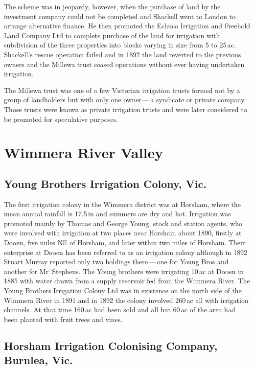 The scheme was in jeopardy, however, when the purchase of land by the
investment company could not be completed and Shackell went to London
to arrange alternative finance.  He then promoted the Echuca
Irrigation and Freehold Land Company Ltd to complete purchase of the
land for irrigation with subdivision of the three properties into
blocks varying in size from 5 to 25\,ac.  Shackell's rescue operation
failed and in 1892 the land reverted to the previous owners and the
Millewa trust ceased operations without ever having undertaken
irrigation.

The Millewa trust was one of a few Victorian irrigation trusts formed
not by a group of landholders but with only one owner\,---\,a syndicate
or private company.  Those trusts were known as private irrigation
trusts and were later considered to be promoted for speculative
purposes.

\section*{Wimmera River Valley}

\subsection*{Young Brothers Irrigation Colony, Vic.}

The first irrigation colony in the Wimmera district was at Horsham,
where the mean annual rainfall is 17.5\,in and summers are dry and
hot.  Irrigation was promoted mainly by Thomas and George Young, stock
and station agents, who were involved with irrigation at two places
near Horsham about 1890, firstly at Dooen, five miles NE of Horsham,
and later within two miles of Horsham.  Their enterprise at Dooen has
been referred to as an irrigation colony although in 1892 Stuart
Murray reported only two holdings there\,---\,one for Young Bros and
another for Mr~Stephens.  The Young brothers were irrigating 10\,ac at
Dooen in 1885 with water drawn from a supply reservoir fed from the
Wimmera River.  The Young Brothers Irrigation Colony Ltd was in
existence on the north side of the Wimmera River in 1891 and in 1892
the colony involved 260\,ac all with irrigation channels.  At that
time 160\,ac had been sold and all but 60\,ac of the area had been
planted with fruit trees and vines.

\subsection*{Horsham Irrigation Colonising Company, Burnlea, Vic.}

